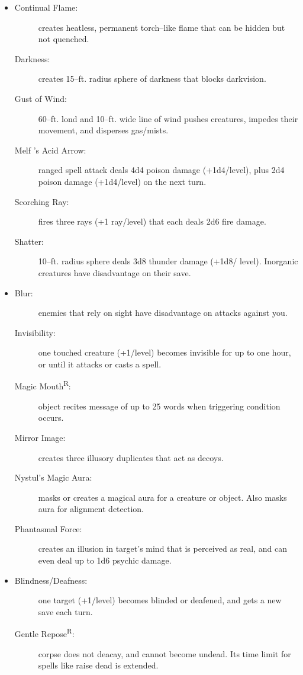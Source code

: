 \documentclass[DIV=14, paper=a4, fontsize=10pt, twocolumn, twoside]{scrartcl}
\begin{document}
\begin{itemize}[align=parleft,labelwidth=1cm]
\begin{description}
\end{description}
\renewcommand{\labelitemi}{Evoc}\item
\begin{description}
 \item[Continual Flame:] creates heatless, permanent torch–like flame that can be hidden but not quenched.
 \item[Darkness:] creates 15–ft. radius sphere of darkness that blocks darkvision.
 \item[Gust of Wind:] 60–ft. lond and 10–ft. wide line of wind pushes creatures, impedes their movement, and disperses gas/mists.
 \item[Melf ’s Acid Arrow:] ranged spell attack deals 4d4 poison damage (+1d4/level), plus 2d4 poison damage (+1d4/level) on the next turn.
 \item[Scorching Ray:] fires three rays (+1 ray/level) that each deals 2d6 fire damage.
 \item[Shatter:] 10–ft. radius sphere deals 3d8 thunder damage (+1d8/ level). Inorganic creatures have disadvantage on their save.
\end{description}
\renewcommand{\labelitemi}{Illus}\item
\begin{description}
 \item[Blur:] enemies that rely on sight have disadvantage on attacks against you.
 \item[Invisibility:] one touched creature (+1/level) becomes invisible for up to one hour, or until it attacks or casts a spell.
 \item[Magic Mouth\textsuperscript{R}:] object recites message of up to 25 words when triggering condition occurs.
 \item[Mirror Image:] creates three illusory duplicates that act as decoys.
 \item[Nystul’s Magic Aura:] masks or creates a magical aura for a creature or object. Also masks aura for alignment detection.
 \item[Phantasmal Force:] creates an illusion in target’s mind that is perceived as real, and can even deal up to 1d6 psychic damage. 
\end{description}
\renewcommand{\labelitemi}{Necro}\item
\begin{description}
 \item[Blindness/Deafness:] one target (+1/level) becomes blinded or deafened, and gets a new save each turn.
 \item[Gentle Repose\textsuperscript{R}:] corpse does not deacay, and cannot become undead. Its time limit for spells like raise dead is extended.

\end{description}
\end{itemize}
\end{document}
